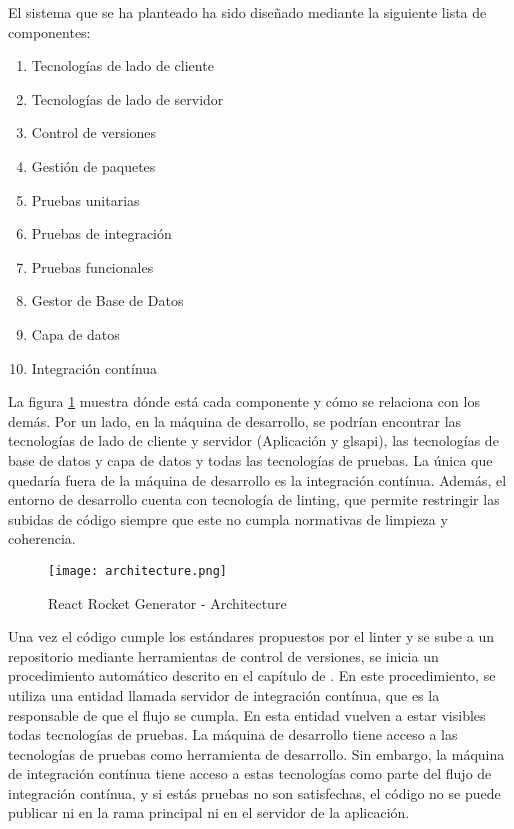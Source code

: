El sistema que se ha planteado ha sido diseñado mediante la siguiente lista de componentes:
\begin{enumerate}
  \item Tecnologías de lado de cliente
  \item Tecnologías de lado de servidor
  \item Control de versiones
  \item Gestión de paquetes
  \item Pruebas unitarias
  \item Pruebas de integración
  \item Pruebas funcionales
  \item Gestor de Base de Datos
  \item Capa de datos
  \item Integración contínua
\end{enumerate}

La figura \cref{fig:architecture} muestra dónde está cada componente y cómo se relaciona con los demás. Por un lado, en la máquina de desarrollo, se podrían encontrar las tecnologías de lado de cliente y servidor (Aplicación y gls{api}), las tecnologías de base de datos y capa de datos y todas las tecnologías de pruebas. La única que quedaría fuera de la máquina de desarrollo es la integración contínua. Además, el entorno de desarrollo cuenta con tecnología de linting, que permite restringir las subidas de código siempre que este no cumpla normativas de limpieza y coherencia.

\begin{figure}
  \centering
  \texttt{[image: architecture.png]}
  \caption{React Rocket Generator - Architecture}
  \label{fig:architecture}
\end{figure}

Una vez el código cumple los estándares propuestos por el linter y se sube a un repositorio mediante herramientas de control de versiones, se inicia un procedimiento automático descrito en el capítulo de . En este procedimiento, se utiliza una entidad llamada servidor de integración contínua, que es la responsable de que el flujo se cumpla. En esta entidad vuelven a estar visibles todas tecnologías de pruebas. La máquina de desarrollo tiene acceso a las tecnologías de pruebas como herramienta de desarrollo. Sin embargo, la máquina de integración contínua tiene acceso a estas tecnologías como parte del flujo de integración contínua, y si estás pruebas no son satisfechas, el código no se puede publicar ni en la rama principal ni en el servidor de la aplicación.

